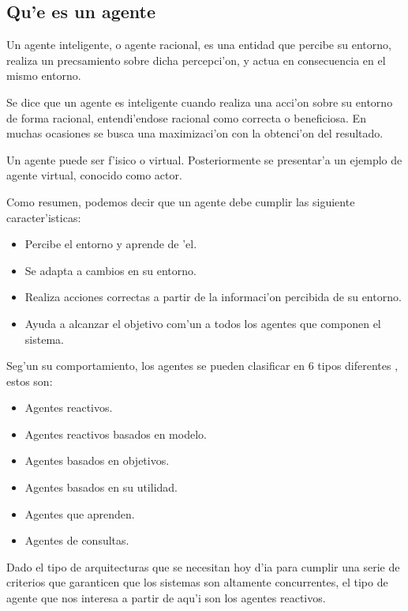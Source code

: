 \documentclass[12pt]{article}
\begin{document}
\subsection{Qu'e es un agente}
\label{sub:que es un agente}
Un agente inteligente, o agente racional, es una entidad que percibe su entorno, realiza
un precsamiento sobre dicha percepci'on, y actua en consecuencia en el mismo entorno.

Se dice que un agente es inteligente cuando realiza una acci'on sobre su entorno de forma racional,
entendi'endose racional como correcta o beneficiosa. En muchas ocasiones se busca una
maximizaci'on con la obtenci'on del resultado.

Un agente puede ser f'isico o virtual. Posteriormente se presentar'a un ejemplo de agente virtual,
conocido como actor.

Como resumen, podemos decir que un agente debe cumplir las siguiente caracter'isticas:

\begin{itemize}
	\item Percibe el entorno y aprende de 'el.
	\item Se adapta a cambios en su entorno.
	\item Realiza acciones correctas a partir de la informaci'on percibida de su entorno.
	\item Ayuda a alcanzar el objetivo com'un a todos los agentes que componen el sistema.
\end{itemize}

Seg'un su comportamiento, los agentes se pueden clasificar en 6 tipos diferentes \cite{kind-of-agents}, estos son:

\begin{itemize}
	\item Agentes reactivos.
	\item Agentes reactivos basados en modelo.
	\item Agentes basados en objetivos.
	\item Agentes basados en su utilidad.
    \item Agentes que aprenden.
    \item Agentes de consultas.
\end{itemize}

Dado el tipo de arquitecturas que se necesitan hoy d'ia para cumplir una serie de criterios que garanticen
que los sistemas son altamente concurrentes, el tipo de agente que nos interesa a partir de aqu'i son los
agentes reactivos.
\end{document}
